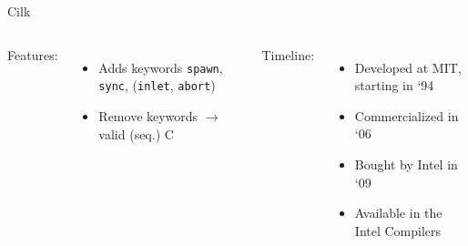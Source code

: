 \documentclass[english,compress]{beamer}
\begin{document}
\begin{frame}{Cilk}
  \begin{columns}
      
      Features:
      \begin{itemize}
        \item Adds keywords 
        \texttt{spawn}, \texttt{sync},
        (\texttt{inlet}, \texttt{abort})
        \item Remove keywords $\rightarrow$ valid (seq.) C
      \end{itemize}

      Timeline:
      \begin{itemize}
        \item Developed at MIT, starting in `94
        \item Commercialized in `06
        \item Bought by Intel in `09
        \item Available in the Intel Compilers
      \end{itemize}

  \end{columns}
\end{frame}
\newcommand{\cilkcredit}{
  \begin{tikzpicture}[overlay]
    \node [above left=1cm of current page.south east]
      [font=\scriptsize,fill=gray!30,opacity=0.8, text width=3.5cm]
      {With material by Charles~E.~Leiserson (MIT)};
  \end{tikzpicture}
}
\newcommand{\cilkslide}[3]{

  \begin{frame}{#1}
    \texttt{[image: cilk-lec-1.pdf]}

    \cilkcredit #3
  \end{frame}
}
\end{document}
